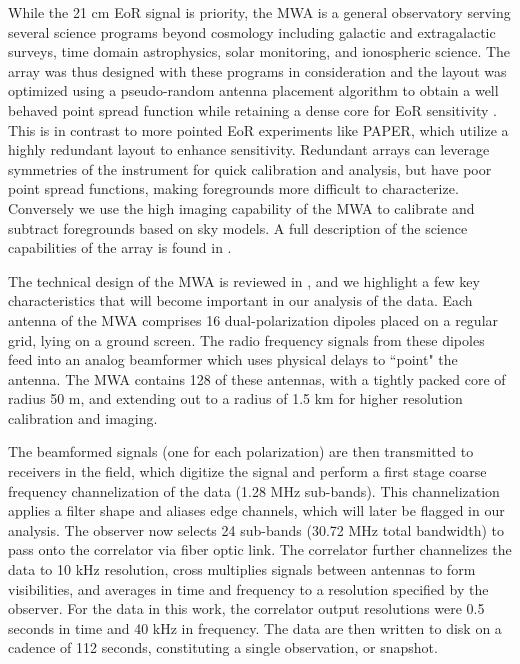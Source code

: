 \documentclass[iop]{emulateapj}
\begin{document}
While the 21 cm EoR signal is priority, the MWA is a general observatory serving several 
science programs beyond cosmology including galactic and extragalactic surveys, time 
domain astrophysics, solar monitoring, and ionospheric science. The array was thus 
designed with these programs in consideration and the layout was optimized using a 
pseudo-random antenna placement algorithm \citep{Beardsley:2012} to obtain a well 
behaved point spread function while retaining a dense core for EoR sensitivity 
\citep{Beardsley:2013}. This is in contrast to more pointed EoR experiments like PAPER, 
which utilize a highly redundant layout to enhance sensitivity. Redundant arrays can 
leverage symmetries of the instrument for quick calibration and analysis, but have poor 
point spread functions, making foregrounds more difficult to characterize. Conversely we 
use the high imaging capability of the MWA to calibrate and subtract foregrounds based on 
sky models. A full description of the science capabilities of the array is found in 
\citealt{Bowman:2013}. 

The technical design of the MWA is reviewed in \citealt{Tingay:2013}, and we highlight a 
few key characteristics that will become important in our analysis of the data. Each 
antenna of the MWA comprises 16 dual-polarization dipoles placed on a regular grid, lying 
on a ground screen. The radio frequency signals from these dipoles feed into an analog 
beamformer which uses physical delays to ``point" the antenna. The MWA contains 128 of 
these antennas, with a tightly packed core of radius 50 m, and extending out to a radius of
1.5 km for higher resolution calibration and imaging.

The beamformed signals (one for each polarization) are then transmitted to receivers in 
the field, which digitize the signal and perform a first stage coarse frequency 
channelization of the data (1.28 MHz sub-bands)\citep{Prabu:2015}. This channelization 
applies a filter shape and aliases edge channels, which will later be flagged in our analysis. 
The observer now selects 24 sub-bands (30.72 MHz total bandwidth) to pass onto the 
correlator via fiber optic link. The correlator further channelizes the data to 10 kHz 
resolution, cross multiplies signals between antennas to form visibilities, and averages in 
time and frequency to a resolution specified by the observer. For the data in this work, the 
correlator output resolutions were 0.5 seconds in time and 40 kHz in frequency. The data 
are then written to disk on a cadence of 112 seconds, constituting a single observation, or 
snapshot.
\end{document}
